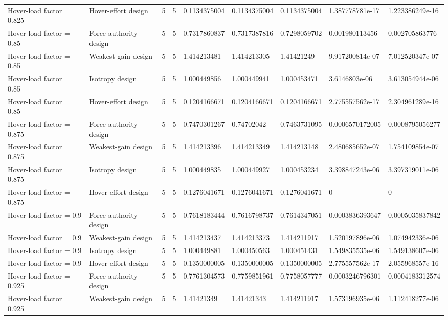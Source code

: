 \begin{tabular}{@{}lllllllll@{}}
Hover-load factor = 0.825 & Hover-effort design & 5 & 5 & 0.1134375004 & 0.1134375004 & 0.1134375004 & 1.387778781e-17 & 1.223386249e-16 \\
Hover-load factor = 0.85 & Force-authority design & 5 & 5 & 0.7317860837 & 0.7317387816 & 0.7298059702 & 0.001980113456 & 0.002705863776 \\
Hover-load factor = 0.85 & Weakest-gain design & 5 & 5 & 1.414213481 & 1.414213305 & 1.41421249 & 9.917200814e-07 & 7.012520347e-07 \\
Hover-load factor = 0.85 & Isotropy design & 5 & 5 & 1.000449856 & 1.000449941 & 1.000453471 & 3.6146803e-06 & 3.613054944e-06 \\
Hover-load factor = 0.85 & Hover-effort design & 5 & 5 & 0.1204166671 & 0.1204166671 & 0.1204166671 & 2.775557562e-17 & 2.304961289e-16 \\
Hover-load factor = 0.875 & Force-authority design & 5 & 5 & 0.7470301267 & 0.74702042 & 0.7463731095 & 0.0006570172005 & 0.0008795056277 \\
Hover-load factor = 0.875 & Weakest-gain design & 5 & 5 & 1.414213396 & 1.414213349 & 1.414213148 & 2.480685652e-07 & 1.754109854e-07 \\
Hover-load factor = 0.875 & Isotropy design & 5 & 5 & 1.000449835 & 1.000449927 & 1.000453234 & 3.398847243e-06 & 3.397319011e-06 \\
Hover-load factor = 0.875 & Hover-effort design & 5 & 5 & 0.1276041671 & 0.1276041671 & 0.1276041671 & 0 & 0 \\
Hover-load factor = 0.9 & Force-authority design & 5 & 5 & 0.7618183444 & 0.7616798737 & 0.7614347051 & 0.0003836393647 & 0.0005035837842 \\
Hover-load factor = 0.9 & Weakest-gain design & 5 & 5 & 1.414213437 & 1.414213373 & 1.414211917 & 1.520197896e-06 & 1.074942336e-06 \\
Hover-load factor = 0.9 & Isotropy design & 5 & 5 & 1.000449881 & 1.000450563 & 1.000451431 & 1.549835535e-06 & 1.549138607e-06 \\
Hover-load factor = 0.9 & Hover-effort design & 5 & 5 & 0.1350000005 & 0.1350000005 & 0.1350000005 & 2.775557562e-17 & 2.055968557e-16 \\
Hover-load factor = 0.925 & Force-authority design & 5 & 5 & 0.7761304573 & 0.7759851961 & 0.7758057777 & 0.0003246796301 & 0.0004183312574 \\
Hover-load factor = 0.925 & Weakest-gain design & 5 & 5 & 1.41421349 & 1.41421343 & 1.414211917 & 1.573196935e-06 & 1.112418277e-06 \\

\end{tabular}
